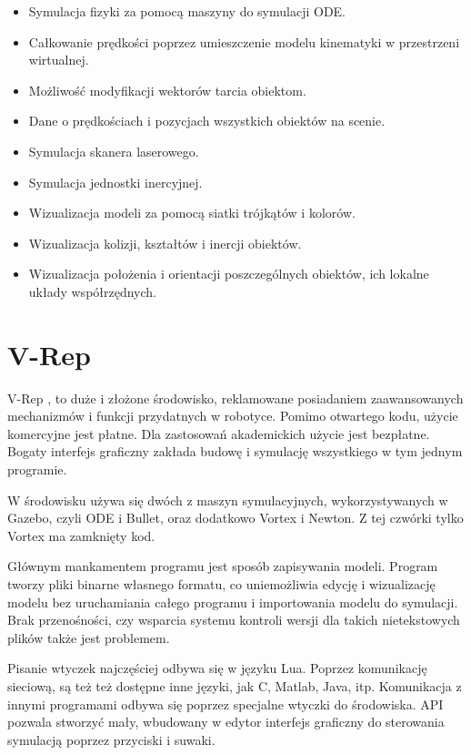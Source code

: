 	\begin{itemize}
		\item Symulacja fizyki za pomocą maszyny do symulacji ODE.
		\item Całkowanie prędkości poprzez umieszczenie modelu kinematyki w przestrzeni wirtualnej.
		\item Możliwość modyfikacji wektorów tarcia obiektom.
		\item Dane o prędkościach i pozycjach wszystkich obiektów na scenie.
		\item Symulacja skanera laserowego.
		\item Symulacja jednostki inercyjnej.
		\item Wizualizacja modeli za pomocą siatki trójkątów i kolorów.
		\item Wizualizacja kolizji, kształtów i inercji obiektów.
		\item Wizualizacja położenia i orientacji poszczególnych obiektów, ich lokalne układy współrzędnych.
	\end{itemize}

\section{V-Rep}
	V-Rep \cite{vrep_website}, to duże i złożone środowisko, reklamowane posiadaniem zaawansowanych mechanizmów i funkcji przydatnych w robotyce.
	Pomimo otwartego kodu, użycie komercyjne jest płatne. Dla zastosowań akademickich użycie jest bezpłatne.
	Bogaty interfejs graficzny zakłada budowę i symulację wszystkiego w tym jednym programie.

	W środowisku używa się dwóch z maszyn symulacyjnych, wykorzystywanych w Gazebo, czyli ODE i Bullet, oraz dodatkowo Vortex i Newton. Z tej czwórki tylko Vortex ma zamknięty kod.

	Głównym mankamentem programu jest sposób zapisywania modeli.
	Program tworzy pliki binarne własnego formatu, co uniemożliwia edycję i wizualizację modelu bez uruchamiania całego programu 
	i importowania modelu do symulacji.
	Brak przenośności, czy wsparcia systemu kontroli wersji dla takich nietekstowych plików także jest problemem.

	Pisanie wtyczek najczęściej odbywa się w języku Lua. Poprzez komunikację sieciową, są też też dostępne inne języki, jak C, Matlab, Java, itp.
	Komunikacja z innymi programami odbywa się poprzez specjalne wtyczki do środowiska.
	API pozwala stworzyć mały, wbudowany w edytor interfejs graficzny do sterowania symulacją poprzez przyciski i suwaki.

